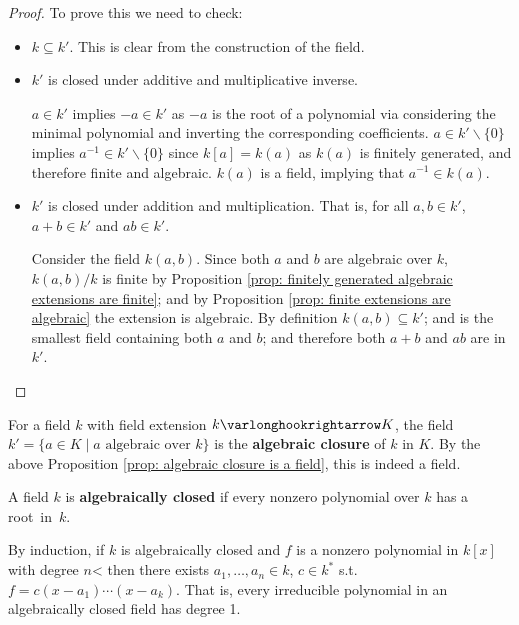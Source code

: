 \begin{proof}
    To prove this we need to check:
    \begin{itemize}
        \item $k \subseteq k'$. This is clear from the construction of the field.
        \item $k'$ is closed under additive and multiplicative inverse. 
        
        $a \in k'$ implies $-a \in k'$ as $-a$ is the root of a polynomial via considering the minimal polynomial and inverting the corresponding coefficients. $a \in k' \smallsetminus \{0\}$ implies $a^{-1} \in k' \smallsetminus \{0\}$ since $k[a] = k(a)$ as $k(a)$ is finitely generated, and therefore finite and algebraic. $k(a)$ is a field, implying that $a^{-1} \in k(a)$.
        \item $k'$ is closed under addition and multiplication. That is, for all $a, b \in k'$, $a + b \in k'$ and $ab \in k'$.

        Consider the field $k(a, b)$. Since both $a$ and $b$ are algebraic over $k$, $k(a, b)/k$ is finite by Proposition \ref{prop: finitely generated algebraic extensions are finite}; and by Proposition \ref{prop: finite extensions are algebraic} the extension is algebraic. By definition $k(a, b) \subseteq k'$; and is the smallest field containing both $a$ and $b$; and therefore both $a + b$ and $ab$ are in $k'$.
    \end{itemize}
\end{proof}

\begin{definition}\label{def: algebraic closure with ambient field}
    For a field $k$ with field extension $k \ext K$, the field $k' = \{a \in K \mid \text{$a$ algebraic over $k$}\}$ is the \textbf{algebraic closure} of $k$ in $K$. By the above Proposition \ref{prop: algebraic closure is a field}, this is indeed a field.
\end{definition}
\nogap
\begin{definition}
    A field $k$ is \textbf{algebraically closed} if every nonzero polynomial over $k$ has a \mbox{root in $k$.}
\end{definition}

\begin{remark}
    By induction, if $k$ is algebraically closed and $f$ is a nonzero polynomial in $k[x]$ with degree $n$< then there exists $a_1, \dots, a_n \in k$, $c \in k^{\ast}$ s.t. $f = c(x - a_1) \cdots (x - a_k)$. That is, every irreducible polynomial in an algebraically closed field has degree 1.
\end{remark}

